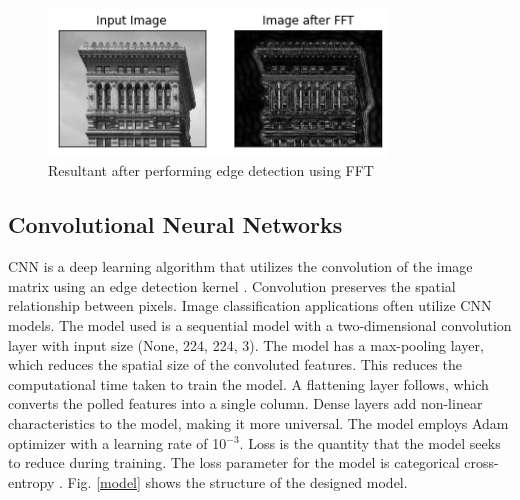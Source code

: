 \documentclass[conference]{IEEEtran}
\begin{document}
\begin{figure}[htpb]
\centerline{\includegraphics[width = 9cm]{fft.png}}
\caption{Resultant after performing edge detection using FFT}
\label{fft}
\end{figure}

\subsection{Convolutional Neural Networks}
CNN is a deep learning algorithm that utilizes the convolution of the image matrix using an edge detection kernel \cite{b11}. Convolution preserves the spatial relationship between pixels. Image classification applications often utilize CNN models. The model used is a sequential model with a two-dimensional convolution layer with input size (None, 224, 224, 3).  The model has a max-pooling layer, which reduces the spatial size of the convoluted features. This reduces the computational time taken to train the model. A flattening layer follows, which converts the polled features into a single column. Dense layers add non-linear characteristics to the model, making it more universal. The model employs Adam optimizer \cite{b9} with a learning rate of 10$^{-3}$. Loss is the quantity that the model seeks to reduce during training. The loss parameter for the model is categorical cross-entropy \cite{b13}. Fig. \ref{model} shows the structure of the designed model.
\end{document}
